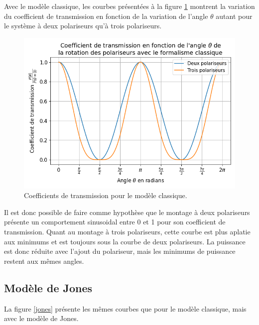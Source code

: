 \documentclass[11pt,letterpaper]{article}
\begin{document}
Avec le modèle classique, les courbes présentées à la figure \ref{classique} montrent la variation
du coefficient de transmission en fonction de la variation de l'angle $\theta$ autant pour le 
système à deux polariseurs qu'à trois polariseurs.

\begin{figure}[H]
  \centering
  \includegraphics[scale=0.7]{coeff_classique.png}
  \caption{Coefficients de transmission pour le modèle classique.}
  \label{classique}
\end{figure}

Il est donc possible de faire comme hypothèse que le montage à deux polariseurs présente un comportement
sinusoidal entre 0 et 1 pour son coefficient de transmission. Quant au montage à trois polariseurs, cette
courbe est plus aplatie aux minimums et est toujours sous la courbe de deux polariseurs. La puissance est
donc réduite avec l'ajout du polariseur, mais les minimums de puissance restent aux mêmes angles.

\subsection{Modèle de Jones}

La figure \ref{jones} présente les mêmes courbes que pour le modèle classique, mais avec le modèle de Jones.
\end{document}
